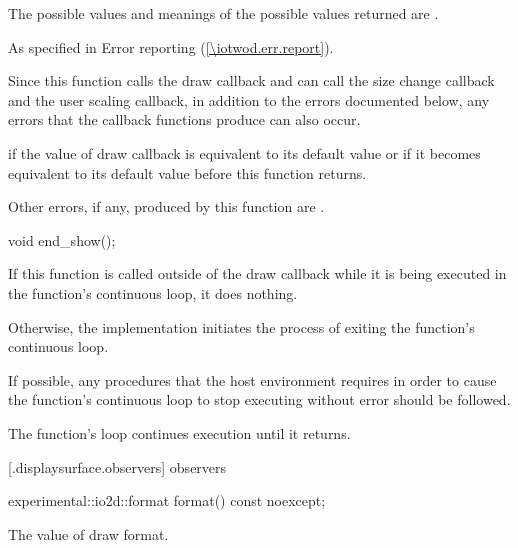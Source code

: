 \begin{itemdescr}
\pnum
\returns
The possible values and meanings of the possible values returned are .

\pnum
\throws
As specified in Error reporting (\ref{\iotwod.err.report}).

\pnum
\remarks
Since this function calls the draw callback and can call the size change callback and the user scaling callback, in addition to the errors documented below, any errors that the callback functions produce can also occur.

\pnum
\errors
\pnum
{} if the value of draw callback is equivalent to its default value or if it becomes equivalent to its default value before this function returns.

\pnum
Other errors, if any, produced by this function are .
\end{itemdescr}

\begin{itemdecl}
void end_show();
\end{itemdecl}
\begin{itemdescr}
\pnum
\effects
If this function is called outside of the draw callback while it is being executed in the  function's continuous loop, it does nothing.

\pnum
Otherwise, the implementation initiates the process of exiting the  function's continuous loop.

\pnum
If possible, any procedures that the host environment requires in order to cause the  function's continuous loop to stop executing without error should be followed.

\pnum
The  function's loop continues execution until it returns.
\end{itemdescr}

 [\iotwod.displaysurface.observers]{ observers}

\begin{itemdecl}
experimental::io2d::format format() const noexcept;
\end{itemdecl}
\begin{itemdescr}
\pnum
\returns
The value of draw format.
\end{itemdescr}

